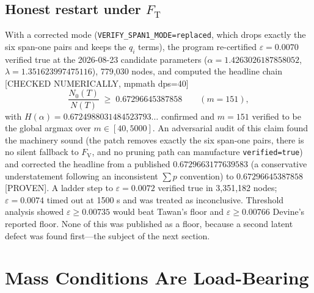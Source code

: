 \documentclass[11pt]{article}
\newcommand{\eps}{\varepsilon}
\newcommand{\Fv}{F_{\mathrm{V}}}
\newcommand{\Ft}{F_{\mathrm{T}}}
\begin{document}
\subsection{Honest restart under $\Ft$}
With a corrected mode (\texttt{VERIFY\_SPAN1\_MODE=replaced}, which drops exactly
the six span-one pairs and keeps the $q_i$ terms), the program re-certified
$\eps = 0.0070$ verified true at the 2026-08-23 candidate parameters
($\alpha = 1.4263026187858052$, $\lambda = 1.351623997475116$), 779{,}030 nodes,
and computed the headline chain [CHECKED NUMERICALLY, mpmath dps=40]
\[
\frac{N_0(T)}{N(T)} \;\ge\; 0.67296645387858 \qquad (m = 151),
\]
with $H(\alpha) = 0.6724988031484523793\ldots$ confirmed and $m=151$ verified
to be the global argmax over $m \in [40,5000]$. An adversarial audit of this
claim found the machinery sound (the patch removes exactly the six span-one
pairs, there is no silent fallback to $\Fv$, and no pruning path can
manufacture \texttt{verified=true}) and corrected the headline from a published
$0.6729663177639583$ (a conservative understatement following an inconsistent
$\sum p$ convention) to $0.67296645387858$ [PROVEN]. A ladder step to
$\eps = 0.0072$ verified true in 3{,}351{,}182 nodes; $\eps = 0.0074$ timed out
at 1500 s and was treated as inconclusive. Threshold analysis showed
$\eps \ge 0.00735$ would beat Tawan's floor and $\eps \ge 0.00766$ Devine's
reported floor. None of this was published as a floor, because a second latent
defect was found first---the subject of the next section.

\section{Mass Conditions Are Load-Bearing}
\label{sec:mass}
\end{document}
